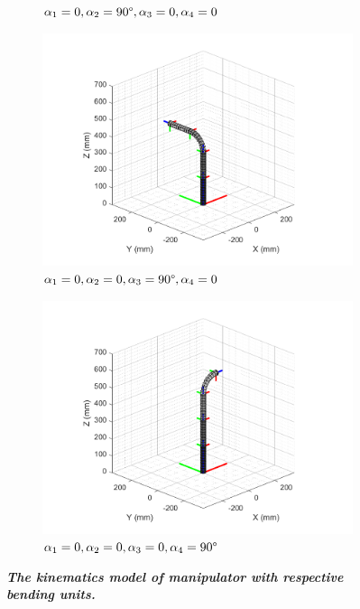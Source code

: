 \begin{figure}[H]
\begin{subfigure}{0.48\textwidth}
        \caption{$\alpha_1=0,\alpha_2=90 \degree,\alpha_3=0,\alpha_4=0$}
    \end{subfigure}
    \begin{subfigure}{0.48\textwidth} %
        \centering
        \includegraphics[width=\linewidth]{Image/MATLAB/manipulator_0_0_90_0.png}
        \caption{$\alpha_1=0,\alpha_2=0,\alpha_3=90 \degree,\alpha_4=0$}
    \end{subfigure}
    \hfill
    \begin{subfigure}{0.48\textwidth}
        \centering
        \includegraphics[width=\linewidth]{Image/MATLAB/manipulator_0_0_0_90.png}
        \caption{$\alpha_1=0,\alpha_2=0,\alpha_3=0,\alpha_4=90 \degree$}
    \end{subfigure}
    \caption[The kinematics model of manipulator with respective bending units]
    {\centering \textit{\textbf{The kinematics model of manipulator with respective bending units.}}}
    \label{fig:kinematics_model_resp}
\end{figure}
